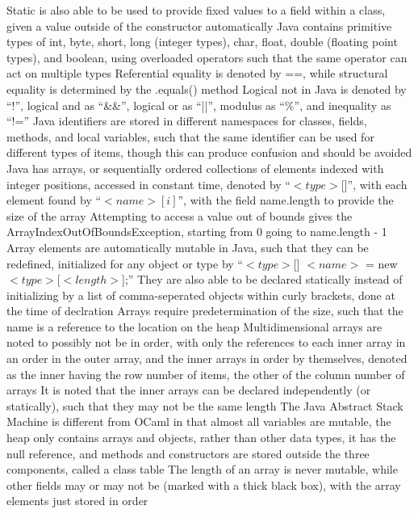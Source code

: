 \documentclass[11 pt, twoside]{article}
\newenvironment{outline*}
{
	\begin{outline}[enumerate]
	}
	{\end{outline}
}
\begin{document}
\begin{outline*}
			\4 Static is also able to be used to provide fixed values to a field within a class, given a value outside of the constructor automatically
\1 Java contains primitive types of int, byte, short, long (integer types), char, float, double (floating point types), and boolean, using overloaded operators such that the same operator can act on multiple types
	\2 Referential equality is denoted by ==, while structural equality is determined by the .equals() method
	\2 Logical not in Java is denoted by ``!'', logical and as ``\&\&'', logical or as ``||'', modulus as ``\%'', and inequality as ``!=''
\1 Java identifiers are stored in different namespaces for classes, fields, methods, and local variables, such that the same identifier can be used for different types of items, though this can produce confusion and should be avoided
\1 Java has arrays, or sequentially ordered collections of elements indexed with integer positions, accessed in constant time, denoted by ``$<type>$[]'', with each element found by ``$<name>[i]$'', with the field name.length to provide the size of the array
	\2 Attempting to access a value out of bounds gives the ArrayIndexOutOfBoundsException, starting from 0 going to name.length - 1
	\2 Array elements are automatically mutable in Java, such that they can be redefined, initialized for any object or type by ``$<type>$[] $<name>$ = new $<type>$[$<length>$];''
		\3 They are also able to be declared statically instead of initializing by a list of comma-seperated objects within curly brackets, done at the time of declration
		\3 Arrays require predetermination of the size, such that the name is a reference to the location on the heap
	\2 Multidimensional arrays are noted to possibly not be in order, with only the references to each inner array in an order in the outer array, and the inner arrays in order by themselves, denoted as the inner having the row number of items, the other of the column number of arrays
		\3 It is noted that the inner arrays can be declared independently (or statically), such that they may not be the same length
\1 The Java Abstract Stack Machine is different from OCaml in that almost all variables are mutable, the heap only contains arrays and objects, rather than other data types, it has the null reference, and methods and constructors are stored outside the three components, called a class table
	\2 The length of an array is never mutable, while other fields may or may not be (marked with a thick black box), with the array elements just stored in order
\end{outline*}
\end{document}
